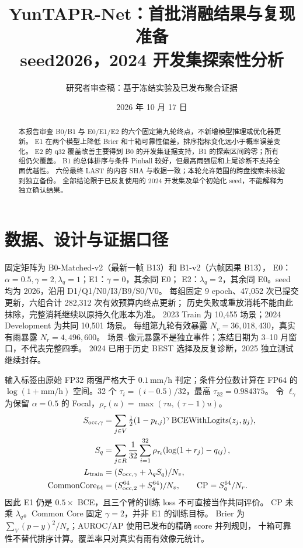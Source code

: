 \documentclass[UTF8,fontset=windows,10pt,a4paper]{ctexart}
\title{YunTAPR-Net：首批消融结果与复现准备\\\large seed2026，2024 开发集探索性分析}
\author{研究者审查稿：基于冻结实验及已发布聚合证据}
\date{2026 年 10 月 17 日}
\begin{document}
\maketitle
\begin{abstract}
本报告审查 B0/B1 与 E0/E1/E2 的六个固定第九轮终点，不新增模型推理或优化器更新。
E1 在两个模型上降低 Brier 和十箱可靠性偏差，排序指标变化远小于概率误差变化。
E2 的 q32 覆盖改善主要得到 B0 的开发集证据支持，B1 的探索区间跨零；所有组仍欠覆盖。
B1 的总体排序与条件 Pinball 较好，但最高雨强层和上尾诊断不支持全面优越性。
六份最终 LAST 的内容 SHA 与收据一致；本轮允许范围的跨盘搜索未核验到独立备份。
全部结论限于已反复使用的 2024 开发集及单个初始化 seed，不能解释为独立确认结果。
\end{abstract}
\section{数据、设计与证据口径}
固定矩阵为 B0-Matched-v2（最新一帧 B13）和 B1-v2（六帧因果 B13），
E0：$\alpha=0.5,\gamma=2,\lambda_q=1$；E1：$\gamma=0$，其余同 E0；
E2：$\lambda_q=2$，其余同 E0。seed 均为 2026，沿用 D1/Q1/N0/I3/B9/S0/V0。
每组固定 9 epoch、47,052 次已提交更新，六组合计 282,312 次有效预算内终点更新；
历史失败或重放消耗不能由此抹除，完整消耗继续以原持久化账本为准。
2023 Train 为 10,455 场景；2024 Development 为共同 10,501 场景。
每组第九轮有效暴露 $N_v=36,018,430$，真实有雨暴露 $N_r=4,496,600$。
场景--像元暴露不是独立事件；冻结日期为 3--10 月窗口，不代表完整四季。
2024 已用于历史 BEST 选择及反复诊断，2025 独立测试继续封存。

输入标签由原始 FP32 雨强严格大于 $0.1\,\mathrm{mm/h}$ 判定；条件分位数计算在
FP64 的 $\log(1+\mathrm{mm/h})$ 空间。32 个 $\tau_i=(i-0.5)/32$，最高 $\tau_{32}=0.984375$。
令 $\ell_{\gamma}$ 为保留 $\alpha=0.5$ 的 Focal，$\rho_\tau(u)=\max(\tau u,(\tau-1)u)$。
\begin{align}
S_{\rm occ,\gamma}&=\sum_{j\in V}\tfrac12(1-p_{t,j})^\gamma\operatorname{BCEWithLogits}(z_j,y_j),\\
S_q&=\sum_{j\in R}\frac1{32}\sum_{i=1}^{32}\rho_{\tau_i}\!\left(\log(1+r_j)-q_{ij}\right),\\
L_{\rm train}&=(S_{\rm occ,\gamma}+\lambda_q S_q)/N_v,\\
\mathrm{CommonCore}_{64}&=(S_{\rm occ,2}^{64}+S_q^{64})/N_v,\qquad
\mathrm{CP}=S_q^{64}/N_r.
\end{align}
因此 E1 仍是 $0.5\times$ BCE，且三个臂的训练 loss 不可直接当作共同评价。
CP 未乘 $\lambda_q$。Common Core 固定 $\gamma=2$，并非 E1 的训练目标。
Brier 为 $\sum_{V}(p-y)^2/N_v$；AUROC/AP 使用已发布的精确 score 并列规则，
十箱可靠性不替代排序计算。覆盖率只对真实有雨有效像元统计。
\end{document}
